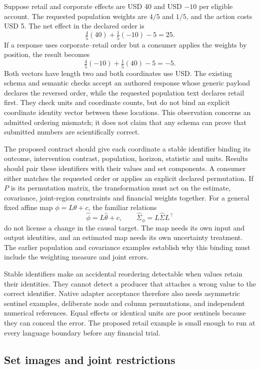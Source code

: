 Suppose retail and corporate effects are USD 40 and USD \(-10\) per eligible
account. The requested population weights are \(4/5\) and \(1/5\), and the
action costs USD 5. The net effect in the declared order is
\[
 \tfrac45(40)+\tfrac15(-10)-5=25.
\]
If a response uses corporate--retail order but a consumer applies the weights
by position, the result becomes
\[
 \tfrac45(-10)+\tfrac15(40)-5=-5.
\]
Both vectors have length two and both coordinates use USD. The existing schema
and semantic checks accept an authored response whose generic payload declares
the reversed order, while the requested population text declares retail first.
They check units and coordinate counts, but do not bind an explicit coordinate
identity vector between these locations. This observation concerns an admitted
ordering mismatch; it does not claim that any schema can prove that submitted
numbers are scientifically correct.
\citep{exec16_topology_runtime,exec16_topology_exact}

The proposed contract should give each coordinate a stable identifier binding
its outcome, intervention contrast, population, horizon, statistic and units.
Results should pair these identifiers with their values and set components.
A consumer either matches the requested order or applies an explicit declared
permutation. If \(P\) is its permutation matrix, the transformation must act on
the estimate, covariance, joint-region constraints and financial weights
together. For a general fixed affine map \(\phi=L\theta+c\), the familiar
relations
\[
 \widehat\phi=L\widehat\theta+c,\qquad
 \widehat\Sigma_\phi=L\widehat\Sigma L^\top
\]
do not license a change in the causal target. The map needs its own input and
output identities, and an estimated map needs its own uncertainty treatment.
The earlier population and covariance examples establish why this binding
must include the weighting measure and joint errors.
\citep{exec13_interchange_examples}

Stable identifiers make an accidental reordering detectable when values retain
their identities. They cannot detect a producer that attaches a wrong value to
the correct identifier. Native adapter acceptance therefore also needs
asymmetric sentinel examples, deliberate node and column permutations, and
independent numerical references. Equal effects or identical units are poor
sentinels because they can conceal the error. The proposed retail example is
small enough to run at every language boundary before any financial trial.

\subsection{Set images and joint restrictions}

